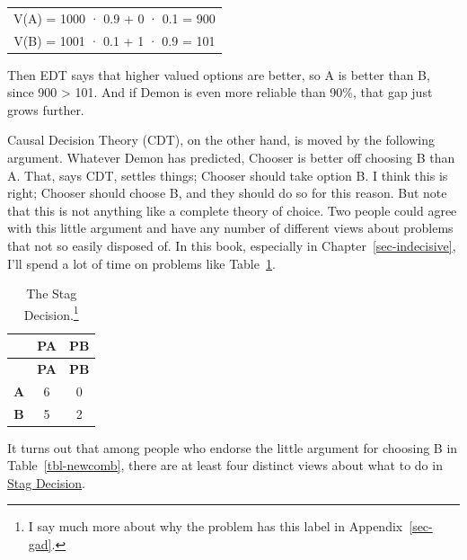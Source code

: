 \documentclass[
  12pt,
  letterpaper,
  DIV=11,
  numbers=noendperiod]{scrreprt}
\begin{document}
\begin{longtable}[]{@{}c@{}}
\toprule\noalign{}
\endhead
\bottomrule\noalign{}
\endlastfoot
V(A) = 1000 · 0.9 + 0 · 0.1 = 900 \\
V(B) = 1001 · 0.1 + 1 · 0.9 = 101 \\
\end{longtable}

Then EDT says that higher valued options are better, so A is better than
B, since 900 \textgreater{} 101. And if Demon is even more reliable than
90\%, that gap just grows further.

Causal Decision Theory (CDT), on the other hand, is moved by the
following argument. Whatever Demon has predicted, Chooser is better off
choosing B than A. That, says CDT, settles things; Chooser should take
option B. I think this is right; Chooser should choose B, and they
should do so for this reason. But note that this is not anything like a
complete theory of choice. Two people could agree with this little
argument and have any number of different views about problems that not
so easily disposed of. In this book, especially in
Chapter~\ref{sec-indecisive}, I'll spend a lot of time on problems like
Table~\ref{tbl-stag-decision-first}.

\hypertarget{tbl-stag-decision-first}{}
\begin{longtable}[]{@{}ccc@{}}
\caption[\label{tbl-stag-decision-first}The Stag
Decision.]{\label{tbl-stag-decision-first}The Stag
Decision.\footnote{I say much more about why the problem has this label
  in Appendix~\ref{sec-gad}.}}\tabularnewline
\toprule\noalign{}
& \textbf{PA} & \textbf{PB} \\
\midrule\noalign{}
\endfirsthead
\toprule\noalign{}
& \textbf{PA} & \textbf{PB} \\
\midrule\noalign{}
\endhead
\bottomrule\noalign{}
\endlastfoot
\textbf{A} & 6 & 0 \\
\textbf{B} & 5 & 2 \\
\end{longtable}

It turns out that among people who endorse the little argument for
choosing B in Table~\ref{tbl-newcomb}, there are at least four distinct
views about what to do in
\protect\hyperlink{tbl-stag-decision-first}{Stag Decision}.
\end{document}
